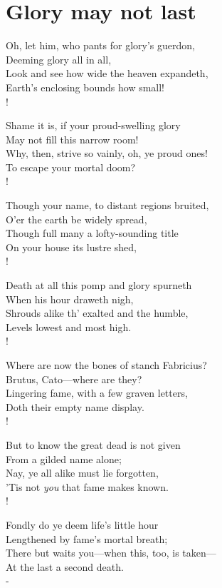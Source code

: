 \documentclass[12pt]{book}
\newenvironment{vpoem}[1]%
  {\def\poemvsindentlines{#1}\begin{poem}\small}%
  {\end{poem}\def\poemvsindentlines{\relax}}
\begin{document}
\section{Glory may not last}

\begin{vpoem}{24}
    Oh, let him, who pants for glory's guerdon, \\
      Deeming glory all in all, \\
    Look and see how wide the heaven expandeth, \\
      Earth's enclosing bounds how small! \\!

    Shame it is, if your proud-swelling glory \\
      May not fill this narrow room! \\
    Why, then, strive so vainly, oh, ye proud ones! \\
      To escape your mortal doom? \\!

    Though your name, to distant regions bruited, \\
      O'er the earth be widely spread, \\
    Though full many a lofty-sounding title \\
      On your house its lustre shed, \\!

    Death at all this pomp and glory spurneth \\
      When his hour draweth nigh, \\
    Shrouds alike th' exalted and the humble, \\
      Levels lowest and most high. \\!

    Where are now the bones of stanch Fabricius? \\
      Brutus, Cato---where are they? \\
    Lingering fame, with a few graven letters, \\
      Doth their empty name display. \\!

    But to know the great dead is not given \\
      From a gilded name alone; \\
    Nay, ye all alike must lie forgotten, \\
      'Tis not \emph{you} that fame makes known. \\!

    Fondly do ye deem life's little hour \\
      Lengthened by fame's mortal breath; \\
    There but waits you---when this, too, is taken--- \\
      At the last a second death. \\-
\end{vpoem}
\end{document}
